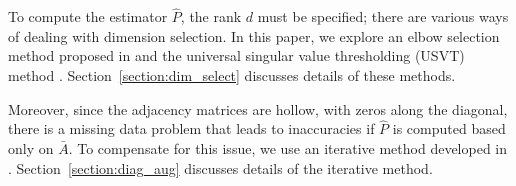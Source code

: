 \documentclass[journal,twoside,web]{ieeecolor}
\renewcommand{\Re}{\mathbb{R}}
\begin{document}

To compute the estimator $\hat{P}$, the rank $d$  must be specified; there are various ways of dealing with dimension selection.
In this paper, we explore an elbow selection method proposed in \cite{zhu2006automatic} and the universal singular value thresholding (USVT) method \cite{chatterjee2015matrix}.
Section~\ref{section:dim_select} discusses details of these methods.

Moreover, since the adjacency matrices are hollow, with zeros along the diagonal, there is a missing data problem that leads to inaccuracies if $\hat{P}$ is computed based only on $\bar{A}$.
To compensate for this issue, we use an iterative method developed in \cite{scheinerman2010modeling}.
Section~\ref{section:diag_aug} discusses details of the iterative method.





\end{document}
